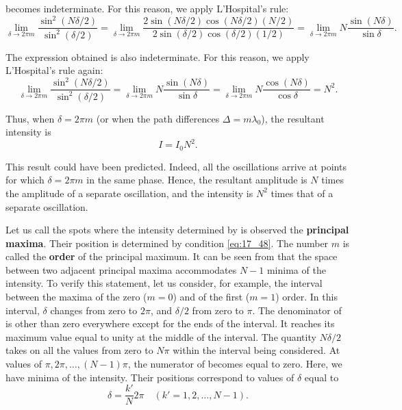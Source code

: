 \noindent
{} becomes indeterminate.
For this reason, we apply L'Hospital's rule:
\begin{equation*}
    \lim_{\delta\to 2\pi m} \frac{\sin^2(N\delta/2)}{\sin^2(\delta/2)} = \lim_{\delta\to 2\pi m} \frac{ 2 \sin(N\delta/2) \cos(N\delta/2) (N/2)}{ 2 \sin(\delta/2) \cos(\delta/2) (1/2) } = \lim_{\delta\to 2\pi m} N \frac{ \sin(N\delta) }{\sin\delta}.
\end{equation*}

\noindent
The expression obtained is also indeterminate.
For this reason, we apply L'Hospital's rule again:
\begin{equation*}
    \lim_{\delta\to 2\pi m} \frac{\sin^2(N\delta/2)}{\sin^2(\delta/2)} = \lim_{\delta\to 2\pi m} N \frac{ \sin(N\delta) }{\sin\delta} = \lim_{\delta\to 2\pi m} N \frac{ \cos(N\delta) }{\cos\delta} = N^2.
\end{equation*}

Thus, when $\delta=2\pi m$ (or when the path differences $\Delta=m\lambda_0$), the resultant intensity is
\begin{equation}\label{eq:17_49}
    I = I_0 N^2.
\end{equation}

\noindent
This result could have been predicted.
Indeed, all the oscillations arrive at points for which $\delta=2\pi m$ in the same phase.
Hence, the resultant amplitude is $N$ times the amplitude of a separate oscillation, and the intensity is $N^2$ times that of a separate oscillation.

Let us call the spots where the intensity determined by  is observed the \textbf{principal maxima}.
Their position is determined by condition \eqref{eq:17_48}.
The number $m$ is called the \textbf{order} of the principal maximum.
It can be seen from  that the space between two adjacent principal maxima accommodates $N-1$ minima of the intensity.
To verify this statement, let us consider, for example, the interval between the maxima of the zero ($m=0$) and of the first ($m=1$) order.
In this interval, $\delta$ changes from zero to $2\pi$, and $\delta/2$ from zero to $\pi$.
The denominator of  is other than zero everywhere except for the ends of the interval.
It reaches its maximum value equal to unity at the middle of the interval.
The quantity $N\delta/2$ takes on all the values from zero to $N\pi$ within the interval being considered.
At values of $\pi, 2\pi, \ldots, (N-1)\pi$, the numerator of  becomes equal to zero.
Here, we have minima of the intensity.
Their positions correspond to values of $\delta$ equal to
\begin{equation}\label{eq:17_50}
    \delta = \frac{k'}{N} 2 \pi \quad (k' = 1, 2, \ldots, N-1).
\end{equation}

